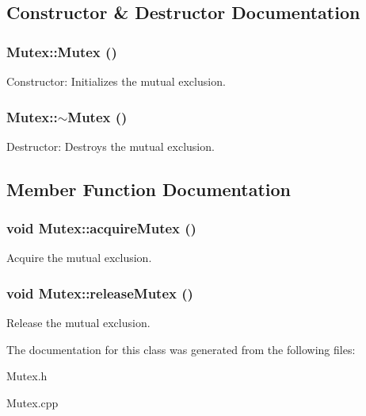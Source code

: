 \subsection{Constructor \& Destructor Documentation}
\hypertarget{classMutex_a593423d868daf926c7b0d63a833ae29a}{
\subsubsection[{Mutex}]{\setlength{\rightskip}{0pt plus 5cm}Mutex::Mutex ()}}
\label{classMutex_a593423d868daf926c7b0d63a833ae29a}
Constructor: Initializes the mutual exclusion. \hypertarget{classMutex_ac9e9182407f5f74892318607888e9be4}{
\subsubsection[{$\sim$Mutex}]{\setlength{\rightskip}{0pt plus 5cm}Mutex::$\sim$Mutex ()}}
\label{classMutex_ac9e9182407f5f74892318607888e9be4}
Destructor: Destroys the mutual exclusion. 

\subsection{Member Function Documentation}
\hypertarget{classMutex_a0f7dda8ab1e2ad808feacb3c9d7fc8ad}{
\subsubsection[{acquireMutex}]{\setlength{\rightskip}{0pt plus 5cm}void Mutex::acquireMutex ()}}
\label{classMutex_a0f7dda8ab1e2ad808feacb3c9d7fc8ad}
Acquire the mutual exclusion. \hypertarget{classMutex_a2f4a3dd7d969f9d77e67ceea9cb6bc3a}{
\subsubsection[{releaseMutex}]{\setlength{\rightskip}{0pt plus 5cm}void Mutex::releaseMutex ()}}
\label{classMutex_a2f4a3dd7d969f9d77e67ceea9cb6bc3a}
Release the mutual exclusion. 

The documentation for this class was generated from the following files:\begin{DoxyCompactItemize}
\item 
Mutex.h\item 
Mutex.cpp\end{DoxyCompactItemize}
